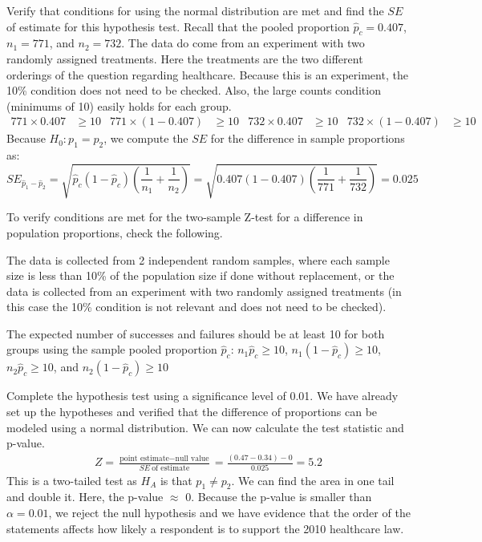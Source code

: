 \begin{examplewrap}
\begin{nexample}{Verify that conditions for using the normal distribution are met and find the $SE$ of estimate for this hypothesis test.  Recall that the pooled proportion $\hat{p}_c=0.407$, $n_1 = 771$, and $n_2=732$.}
The data do come from an experiment with two randomly assigned treatments.  Here the treatments are the two different orderings of the question regarding healthcare.  Because this is an experiment, the 10\% condition does not need to be checked.  Also, the large counts condition (minimums of 10) easily holds for each group.
\begin{align*}
771 \times 0.407 &\ge 10
	&771 \times (1-0.407) &\ge 10
	&732 \times 0.407 &\ge 10
	&732 \times (1-0.407) &\ge 10
\end{align*}
Because $H_0: p_1=p_2$, we compute the $SE$ for the difference in sample proportions as:
$$SE_{\hat{p}_1-\hat{p}_2} =\sqrt{\hat{p}_c(1-\hat{p}_c)\left(\frac{1}{n_1} + \frac{1}{n_2} \right)}=\sqrt{0.407(1-0.407)\left(\frac{1}{771} + \frac{1}{732}\right)}=0.025$$
\end{nexample}
\end{examplewrap}


To verify conditions are met for the two-sample Z-test for a difference in population proportions, check the following.
\begin{description}
\setlength{\itemsep}{0mm}
\item[Independence.]
  The data is collected from 2 independent random samples, where each sample size is less than 10\% of the population size if done without replacement, or the data is collected from an experiment with two randomly assigned treatments (in this case the 10\% condition is not relevant and does not need to be checked).
\item[Large counts.]
 The expected number of successes and failures should be at least 10 for both groups using the sample pooled proportion $\hat{p}_c$:
 $n_1\hat{p}_c \ge 10$, $n_1(1-\hat{p}_c) \ge 10$, $n_2\hat{p}_c \ge 10$, and $n_2(1 -\hat{p}_c) \ge 10$
\end{description}


\begin{examplewrap}
\begin{nexample}{Complete the hypothesis test using a significance level of 0.01.}
We have already set up the hypotheses and verified that the difference of proportions can be modeled using a normal distribution.  We can now calculate the test statistic and p-value.  
\begin{eqnarray*}
Z = \frac{\text{point estimate} - \text{null value}}{SE\ \text{of estimate}}= \frac{(0.47-0.34) - 0}{0.025} = 5.2
\end{eqnarray*}
This is a two-tailed test as $H_A$ is that $p_1\ne p_2$.  We can find the area in one tail and double it.  Here, the p-value $\approx$ 0.  Because the p-value is smaller than $\alpha = 0.01$, we reject the null hypothesis and we have evidence that the order of the statements affects how likely a respondent is to support the 2010 healthcare law.
\end{nexample}
\end{examplewrap}

